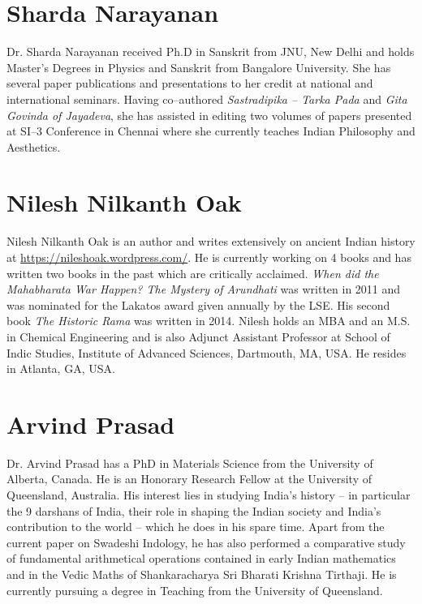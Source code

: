 \section*{Sharda Narayanan}

Dr. Sharda Narayanan received Ph.D in Sanskrit from JNU, New Delhi and holds Master's Degrees in Physics and Sanskrit from Bangalore University. She has several paper publications and presentations to her credit at national and international seminars. Having co–authored \textit{Sastradipika – Tarka Pada} and \textit{Gita Govinda of Jayadeva}, she has assisted in editing two volumes of papers presented at SI–3 Conference in Chennai where she currently teaches Indian Philosophy and Aesthetics.


\section*{Nilesh Nilkanth Oak}

Nilesh Nilkanth Oak is an author and writes extensively on ancient Indian history at \url{https://nileshoak.wordpress.com/}. He is currently working on 4 books and has written two books in the past which are critically acclaimed. \textit{When did the Mahabharata War Happen? The Mystery of Arundhati} was written in 2011 and was nominated for the Lakatos award given annually by the LSE. His second book \textit{The Historic Rama }was written in 2014. Nilesh holds an MBA and an M.S. in Chemical Engineering and is also Adjunct Assistant Professor at School of Indic Studies, Institute of Advanced Sciences, Dartmouth, MA, USA. He resides in Atlanta, GA, USA.


\section*{Arvind Prasad}

Dr. Arvind Prasad has a PhD in Materials Science from the University of Alberta, Canada. He is an Honorary Research Fellow at the University of Queensland, Australia. His interest lies in studying India’s history – in particular the 9 darshans of India, their role in shaping the Indian society and India’s contribution to the world – which he does in his spare time. Apart from the current paper on Swadeshi Indology, he has also performed a comparative study of fundamental arithmetical operations contained in early Indian mathematics and in the Vedic Maths of Shankaracharya Sri Bharati Krishna Tirthaji. He is currently pursuing a degree in Teaching from the University of Queensland.


